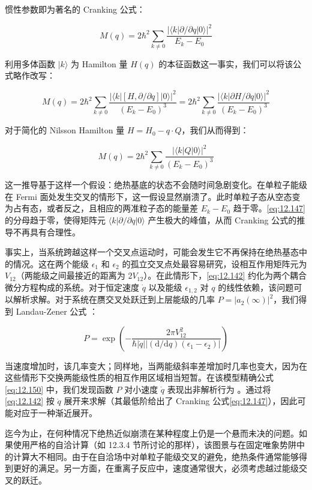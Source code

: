 惯性参数即为著名的 Cranking 公式：

\begin{equation}
M(q)=2\hbar^{2}\sum_{k\neq0}\frac{|\langle k|\partial/\partial q|0\rangle|^{2}}{E_{k}-E_{0}}\label{eq:12.147}
\end{equation}

利用多体函数 $|k\rangle$ 为 Hamilton 量 $H(q)$ 的本征函数这一事实，我们可以将该公式略作改写：

\begin{equation}
M(q)=2\hbar^{2}\sum_{k\neq0}\frac{|\langle k|[H,\partial/\partial q]|0\rangle|^{2}}{(E_{k}-E_{0})^{3}}=2\hbar^{2}\sum_{k\neq0}\frac{|\langle k|\partial H/\partial q|0\rangle|^{2}}{(E_{k}-E_{0})^{3}}\label{eq:12.148}
\end{equation}

对于简化的 Nilsson Hamilton 量 $H=H_{0}-q\cdot Q$，我们从而得到：

\begin{equation}
M(q)=2\hbar^{2}\sum_{k\neq0}\frac{|\langle k|Q|0\rangle|^{2}}{(E_{k}-E_{0})^{3}}\label{eq:12.149}
\end{equation}

这一推导基于这样一个假设：绝热基底的状态不会随时间急剧变化。在单粒子能级在 Fermi 面处发生交叉的情形下，这一假设显然崩溃了。此时单粒子态从空态变为占有态，或者反之，且相应的两准粒子态的能量差
$E_{k}-E_{0}$ 趋于零。\ref{eq:12.147} 的分母趋于零，使得矩阵元 $\langle k|\partial/\partial q|0\rangle$
产生极大的峰值，从而 Cranking 公式的推导不再具有合理性。

事实上，当系统跨越这样一个交叉点运动时，可能会发生它不再保持在绝热基态中的情况。这在两个能级 $\epsilon_{1}$ 和 $\epsilon_{2}$
的孤立交叉点处最容易研究，设相互作用矩阵元为 $V_{12}$（两能级之间最接近的距离为 $2V_{12}$）。在此情形下，\ref{eq:12.142}
约化为两个耦合微分方程构成的系统。对于恒定速度 $\dot{q}$ 以及能级 $\epsilon_{1,2}$ 对 $q$ 的线性依赖，该问题可以解析求解。对于系统在赝交叉处跃迁到上层能级的几率
$P=|a_{2}(\infty)|^{2}$，我们得到 Landau-Zener 公式 \cite{La32,Ze32}：

\begin{equation}
P=\exp\left(-\frac{2\pi V^{2}_{12}}{\hbar|\dot{q}||(\mathrm{d}/\mathrm{d}q)(\epsilon_{1}-\epsilon_{2})|}\right)\label{eq:12.150}
\end{equation}

当速度增加时，该几率变大；同样地，当两能级斜率差增加时几率也变大，因为在这些情形下交换两能级性质的相互作用区域相当短暂。在该模型精确公式\ref{eq:12.150}
中，我们发现函数 $P$ 对小速度 $\dot{q}$ 表现出非解析行为 \cite{Sch77a}。通过将\ref{eq:12.142}
按 $\dot{q}$ 展开来求解（其最低阶给出了 Cranking 公式\ref{eq:12.147}），因此可能对应于一种渐近展开。

迄今为止，在何种情况下绝热近似崩溃在某种程度上仍是一个悬而未决的问题。如果使用严格的自洽计算（如 12.3.4 节所讨论的那样），该图景与在固定唯象势阱中的计算大不相同。由于在自洽场中对单粒子能级交叉的避免，绝热条件通常能够得到更好的满足。另一方面，在重离子反应中，速度通常很大，必须考虑越过能级交叉的跃迁。
